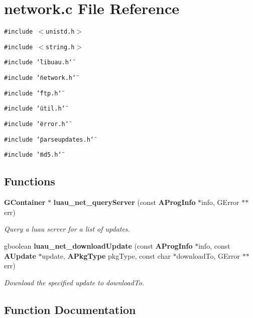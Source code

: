 \section{network.c File Reference}
\label{network_8c}
{\tt \#include $<$unistd.h$>$}\par
{\tt \#include $<$string.h$>$}\par
{\tt \#include \char`\"{}libuau.h\char`\"{}}\par
{\tt \#include \char`\"{}network.h\char`\"{}}\par
{\tt \#include \char`\"{}ftp.h\char`\"{}}\par
{\tt \#include \char`\"{}util.h\char`\"{}}\par
{\tt \#include \char`\"{}error.h\char`\"{}}\par
{\tt \#include \char`\"{}parseupdates.h\char`\"{}}\par
{\tt \#include \char`\"{}md5.h\char`\"{}}\par
\subsection*{Functions}
\begin{CompactItemize}
\item 
{\bf GContainer} $\ast$ {\bf luau\_\-net\_\-query\-Server} (const {\bf AProg\-Info} $\ast$info, GError $\ast$$\ast$err)
\begin{CompactList}\small\item\em Query a luau server for a list of updates. \item\end{CompactList}\item 
gboolean {\bf luau\_\-net\_\-download\-Update} (const {\bf AProg\-Info} $\ast$info, const {\bf AUpdate} $\ast$update, {\bf APkg\-Type} pkg\-Type, const char $\ast$download\-To, GError $\ast$$\ast$err)
\begin{CompactList}\small\item\em Download the specified update to download\-To. \item\end{CompactList}\end{CompactItemize}


\subsection{Function Documentation}
